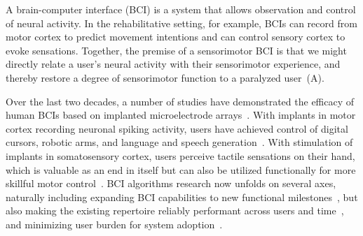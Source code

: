 \documentclass[12pt,oneside]{report}
\begin{document}
A brain-computer interface (BCI) is a system that allows observation and control of neural activity. In the rehabilitative setting, for example, BCIs can record from motor cortex to predict movement intentions and can control sensory cortex to evoke sensations. Together, the premise of a sensorimotor BCI is that we might directly relate a user's neural activity with their sensorimotor experience, and thereby restore a degree of sensorimotor function to a paralyzed user~(A).

Over the last two decades, a number of studies have demonstrated the efficacy of human BCIs based on implanted microelectrode arrays~\citep{Brandman17Review,pandarinath_22_review}.
With implants in motor cortex recording neuronal spiking activity, users have achieved control of digital cursors, robotic arms, and language and speech generation~\citep{collinger2013high,willett_23_speech,wairagkar25voice,Pandarinath2017Pointandclick}.
With stimulation of implants in somatosensory cortex, users perceive tactile sensations on their hand, which is valuable as an end in itself but can also be utilized functionally for more skillful motor control~\citep{flesher2016intracortical,graczyk2024clinical,flesher2021functional,ArmentaSalas2018}.
BCI algorithms research now unfolds on several axes, naturally including expanding BCI capabilities to new functional milestones~\citep{willsey2024real,wairagkar25voice}, but also making the existing repertoire reliably performant across users and time~\citep{hosman2023months,fan2023plugandplay}, and minimizing user burden for system adoption~\citep{pandarinath_22_review,card2025long}.
\end{document}
